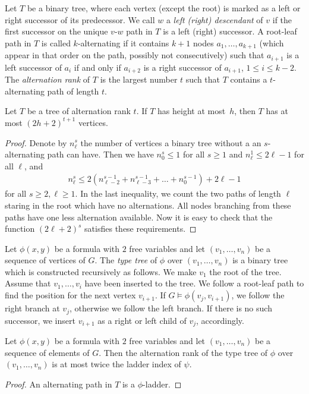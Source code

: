 Let $T$ be a binary tree, where each vertex (except the root) is 
marked as a left or right successor of its predecessor. We call $w$ 
a \emph{left (right) descendant} of $v$ if the first successor on the unique
$v$-$w$ path in $T$ is a left (right) successor. A root-leaf path in $T$ is called
$k$-alternating if it contains $k+1$ nodes $a_1,\ldots, a_{k+1}$ (which appear
in that order on the path, possibly not consecutively) such that $a_{i+1}$ is a left successor of $a_i$
if and only if $a_{i+2}$ is a right successor of $a_{i+1}$, $1\leq i\leq k-2$. 
The \emph{alternation rank} of $T$ is the largest number $t$ such that 
$T$ contains a $t$-alternating path of length $t$.

\begin{lemma}\label{lem:number-of-nodes}
Let $T$ be a tree of alternation rank $t$. If
$T$ has height at most~$h$, then $T$ has at most $(2h+2)^{t+1}$
vertices. 
\end{lemma}
\begin{proof}
Denote by $n_\ell^s$ the number of vertices a binary tree without a 
an $s$-alternating path can have. Then we have $n_0^s\leq 1$ for all $s\geq 1$
and $n_\ell^1\leq 2\ell-1$ for all $\ell$, and 
\begin{align*}
n_\ell^s\leq 2(n_{\ell-2}^{s-1}+n_{\ell-3}^{s-1}+\ldots + n_{0}^{s-1})+2\ell-1
\end{align*}
for all $s\geq 2,\ell\geq 1$. In the last inequality, we count the two paths of length
$\ell$ staring in the root which have no alternations. All nodes branching from 
these paths have one less alternation available. 
Now it is easy to check that the function $(2\ell+2)^s$ satisfies these requirements. 
\end{proof}

Let $\phi(x,y)$ be a formula with $2$ free variables and let $(v_1,\ldots, v_n)$
be a sequence of vertices of $G$. The \emph{type tree}
of $\phi$ over $(v_1,\ldots,v_n)$ is a binary tree which is constructed recursively as 
follows. We make $v_1$ the root of the tree. Assume that $v_1,\ldots, v_i$
have been inserted to the tree. We follow a root-leaf path to find the
position for the next vertex $v_{i+1}$. If $G\models\phi(v_j,v_{i+1})$, we
follow the right branch at $v_j$, otherwise we follow the left branch. If there is
no such successor, we insert $v_{i+1}$ as a right or left child of $v_j$, 
accordingly. 

\begin{lemma}
Let $\phi(x,y)$ be a formula with $2$ free variables and let
$(v_1,\ldots, v_n)$ be a sequence of elements of $G$. Then the 
alternation rank of the type tree of $\phi$ over $(v_1,\ldots, v_n)$
is at most twice the ladder index of $\psi$. 
\end{lemma}
\begin{proof}
An alternating path in $T$ is a $\phi$-ladder.
\end{proof}


